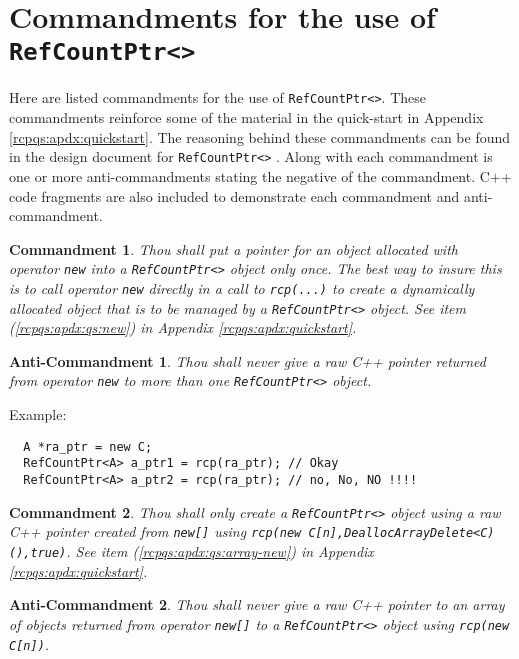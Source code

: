 \documentclass[pdf,ps2pdf,11pt]{SANDreport}
\newtheorem{commandment}{Commandment}
\newtheorem{anticommandment}{Anti-Commandment}
\begin{document}
%
\section{Commandments for the use of {}\texttt{Ref\-Count\-Ptr<>}}
\label{rcpqs:apdx:commandments}
%

Here are listed commandments for the use of
{}\texttt{Ref\-Count\-Ptr<>}.  These commandments reinforce some of
the material in the quick-start in Appendix
{}\ref{rcpqs:apdx:quickstart}.  The reasoning behind these
commandments can be found in the design document for
{}\texttt{Ref\-Count\-Ptr<>} {}\cite{ref:RefCountPtr}.  Along with
each commandment is one or more anti-commandments stating the negative
of the commandment.  C++ code fragments are also included to
demonstrate each commandment and anti-commandment.

\begin{commandment}\label{rcp:cmd:rcp-new}
Thou shall put a pointer for an object allocated with operator
{}\texttt{new} into a {}\texttt{Ref\-Count\-Ptr<>} object only once.
The best way to insure this is to call operator {}\texttt{new}
directly in a call to {}\texttt{rcp(...)} to create a dynamically
allocated object that is to be managed by a
{}\texttt{Ref\-Count\-Ptr<>} object.  See item
({}\ref{rcpqs:apdx:qs:new}) in Appendix
{}\ref{rcpqs:apdx:quickstart}.
\end{commandment}

\begin{anticommandment}
Thou shall never give a raw C++ pointer returned from operator
{}\texttt{new} to more than one {}\texttt{Ref\-Count\-Ptr<>} object.
\end{anticommandment}

{}\noindent{}Example:
{\small\begin{verbatim}
  A *ra_ptr = new C;
  RefCountPtr<A> a_ptr1 = rcp(ra_ptr); // Okay
  RefCountPtr<A> a_ptr2 = rcp(ra_ptr); // no, No, NO !!!!
\end{verbatim}}

\begin{commandment}\label{rcp:cmd:rcp-new}
Thou shall only create a {}\texttt{Ref\-Count\-Ptr<>} object using a
raw C++ pointer created from {}\texttt{new[]} using {}\texttt{rcp(new
C[n],DeallocArrayDelete<C)(),true)}.  See item
({}\ref{rcpqs:apdx:qs:array-new}) in Appendix
{}\ref{rcpqs:apdx:quickstart}.
\end{commandment}

\begin{anticommandment}
Thou shall never give a raw C++ pointer to an array of objects
returned from operator {}\texttt{new[]} to a
{}\texttt{Ref\-Count\-Ptr<>} object using {}\texttt{rcp(new C[n])}.
\end{anticommandment}
\end{document}
